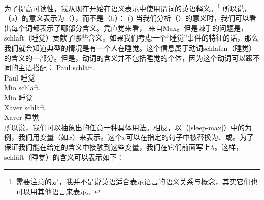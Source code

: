 \noindent
为了提高可读性，我从现在开始在语义表示中使用谓词的英语释义。\footnote{%
需要注意的是，我并不是说英语适合表示语言的语义关系与概念，其实它们也可以用其他语言来表示。
}
所以说，（a）的意义表示为（），而不是（b）：
\ea
\label{sleep-max}
()
\z
当我们分析（）的意义时，我们可以看出每个词都表示了哪部分含义。凭直觉来看， 来自Max。但是棘手的问题是，schläft（睡觉）贡献了哪些含义。如果我们考虑一个“睡觉”事件的特征的话，那么我们就会知道典型的情况是有一个人在睡觉。这个信息属于动词schlafen（睡觉）的含义的一部分。但是，动词的含义并不包括睡觉的个体，因为这个动词可以跟不同的主语搭配：
 \eal
\ex 
\gll Paul schläft.\\
     Paul 睡觉\\
\ex 
\gll Mio schläft.\\
     Mio 睡觉\\
\ex 
\gll Xaver schläft.\\
     Xaver 睡觉\\
\zl
所以说，我们可以抽象出的任意一种具体用法。相反，以（\ref{sleep-max}）中的为例，我们用变量（如$x$）来表示。这个$x$可以在指定的句子中被替换为、或。为了保证我们能在给定的含义中接触到这些变量，我们在它们前面写上$\lambda$。这样，schläft（睡觉）的含义可以表示如下：
